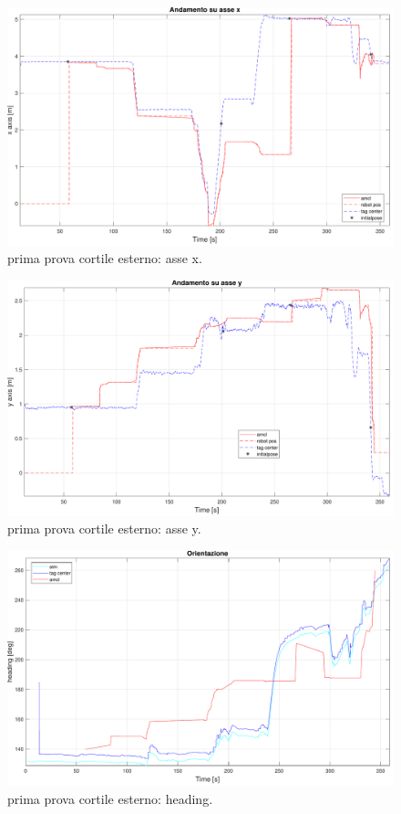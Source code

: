 \begin{figure}[] 
	\centering    
	\includegraphics[width=.8\textwidth]{figs/grafici_cortile/prova1/figure3.pdf}
	\caption{prima prova cortile esterno: asse x.}
	\label{fig. x prima prova esterno}
\end{figure}

\begin{figure}[] 
	\centering    
	\includegraphics[width=.8\textwidth]{figs/grafici_cortile/prova1/figure2.pdf}
	\caption{prima prova cortile esterno: asse y.}
	\label{fig. y prima prova esterno}
\end{figure}

\begin{figure}[] 
	\centering    
	\includegraphics[width=.8\textwidth]{figs/grafici_cortile/prova1/figure1.pdf}
	\caption{prima prova cortile esterno: heading.}
	\label{fig. or prima prova esterno}
\end{figure}

